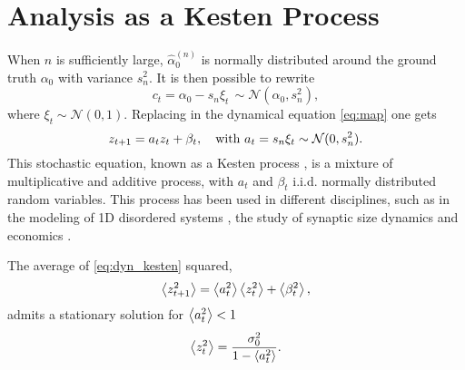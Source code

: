 \documentclass[FinalReport.tex]{subfiles}
\begin{document}
\section{Analysis as a Kesten Process}
When $n$ is sufficiently large, $\hat{\alpha}_0^{(n)}$ is normally distributed around the ground truth $\alpha_0$ with variance $s_n^2$. It is then possible to rewrite
\begin{equation}
	c_t = \alpha_0-s_n\xi_t\,\sim\mathcal{N}(\alpha_0,s_n^2),	
\end{equation}
where $\xi_t\sim\mathcal{N}(0,1)$. Replacing in the dynamical equation \eqref{eq:map} one gets
\begin{equation}\label{eq:dyn_kesten}
	z_{t+1}=a_t z_t+\beta_t, \quad \text{with } a_t=s_n\xi_t	\sim\mathcal{N}(0,s_n^2).
\end{equation}
This stochastic equation, known as a Kesten process \cite{kesten}, is a mixture of multiplicative and additive process, with $a_t$ and $\beta_t$ i.i.d. normally distributed random variables. This process has been used in different disciplines, such as in the modeling of 1D disordered systems \cite{kesten-process-physics}, the study of synaptic size dynamics \cite{kesten-process-synapse-2,kesten-synapses} and economics \cite{kesten-econ}.

The average of \eqref{eq:dyn_kesten} squared,
\begin{equation}
	\expval{z_{t+1}^2}=\expval{a_t^2}\expval{z_t^2}+\expval{\beta_t^2},	
\end{equation}
admits a stationary solution for $\expval{a_t^2}<1$
\begin{equation}\label{eq:cond_stat_sol}	
	\expval{z_t^2}=\frac{\sigma_0^2}{1-\expval{a_t^2}}.	
\end{equation}
\end{document}

